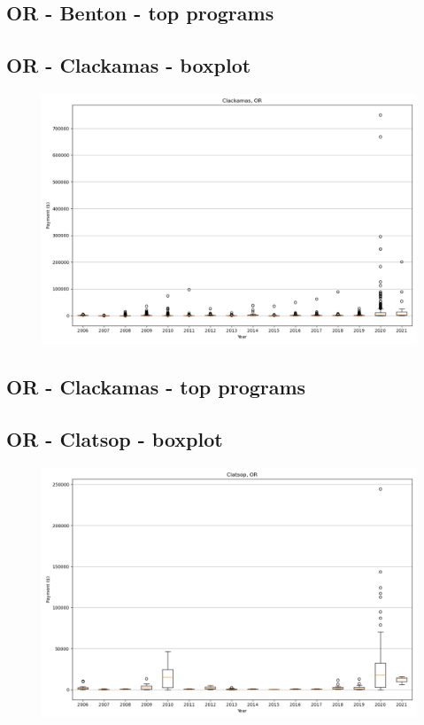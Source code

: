 \subsection*{OR - Benton - top programs}

\newpage
\subsection*{OR - Clackamas - boxplot}
\begin{figure}[h]
\centering
\includegraphics[width=7in]{../output/boxplots/counties/Clackamas-OR_boxplot.png}
\end{figure}


\subsection*{OR - Clackamas - top programs}

\newpage
\subsection*{OR - Clatsop - boxplot}
\begin{figure}[h]
\centering
\includegraphics[width=7in]{../output/boxplots/counties/Clatsop-OR_boxplot.png}
\end{figure}


